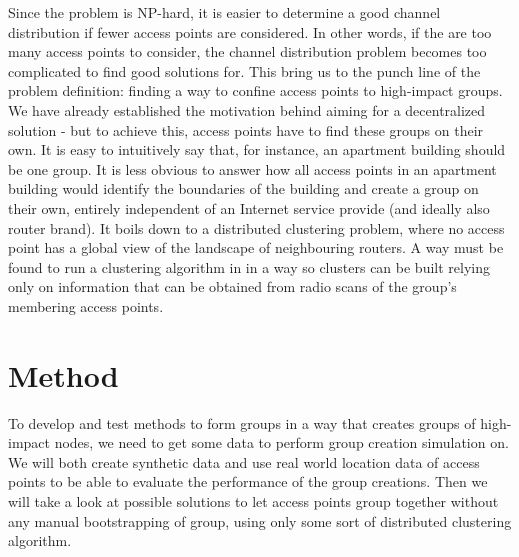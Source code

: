 Since the problem is NP-hard, it is easier to determine a good channel distribution if fewer access points are considered. In other words, if the are too many access points to consider, 
the channel distribution problem becomes too complicated to find good solutions for.
This bring us to the punch line of the problem definition: finding a way to confine access points to high-impact groups. We have already established the motivation behind aiming for a decentralized solution - but to achieve this, access points have to find these groups on their own. It is easy to intuitively say that, for instance, an apartment building should be one group. It is less obvious to answer how all access points in an apartment building would identify the boundaries of the building and create a group on their own, entirely independent of an Internet service provide (and ideally also router brand).
It boils down to a distributed clustering problem, where no access point has a global view of the landscape of neighbouring routers. A way must be found to run
a clustering algorithm in in a way so clusters can be built relying only on information that can be obtained from radio scans of the group's membering access points.

\section{Method}
To develop and test methods to form groups in a way that creates groups of high-impact nodes, we need to get some data to perform
group creation simulation on. We will both create synthetic data and use real world location data of access points to be able to evaluate the performance of the group creations. 
Then we will take a look at possible solutions to let access points group together without any manual bootstrapping of group, using only some sort
of distributed clustering algorithm.

